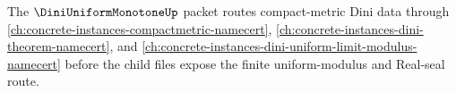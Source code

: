 The $\DiniUniformMonotoneUp$ packet routes compact-metric Dini data through \autoref{ch:concrete-instances-compactmetric-namecert}, \autoref{ch:concrete-instances-dini-theorem-namecert}, and \autoref{ch:concrete-instances-dini-uniform-limit-modulus-namecert} before the child files expose the finite uniform-modulus and Real-seal route.



